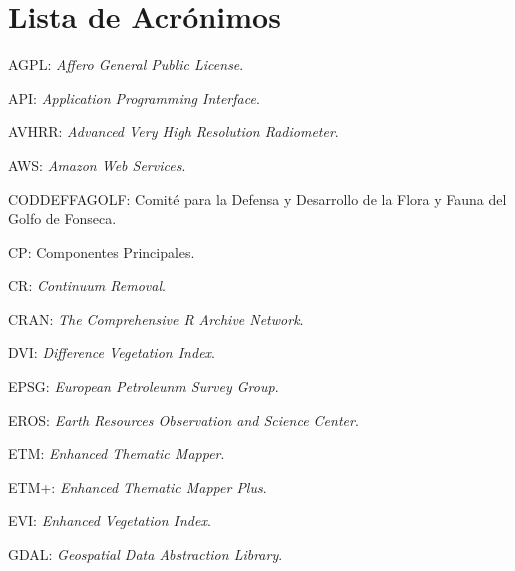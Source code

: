 


\chapter*{Lista de Acrónimos}

AGPL: \textit{Affero General Public License}.

API: \textit{Application Programming Interface}.

AVHRR: \textit{Advanced Very High Resolution Radiometer}.

AWS: \textit{Amazon Web Services}.

CODDEFFAGOLF: Comité para la Defensa y Desarrollo de la Flora y Fauna del Golfo de Fonseca.

CP: Componentes Principales.

CR: \textit{Continuum Removal}.

CRAN: \textit{The Comprehensive R Archive Network}.

DVI: \textit{Difference Vegetation Index}.

EPSG: \textit{European Petroleunm Survey Group}.

EROS: \textit{Earth Resources Observation and Science Center}.

ETM: \textit{Enhanced Thematic Mapper}.

ETM+: \textit{Enhanced Thematic Mapper Plus}.

EVI: \textit{Enhanced Vegetation Index}.

GDAL: \textit{Geospatial Data Abstraction Library}.

